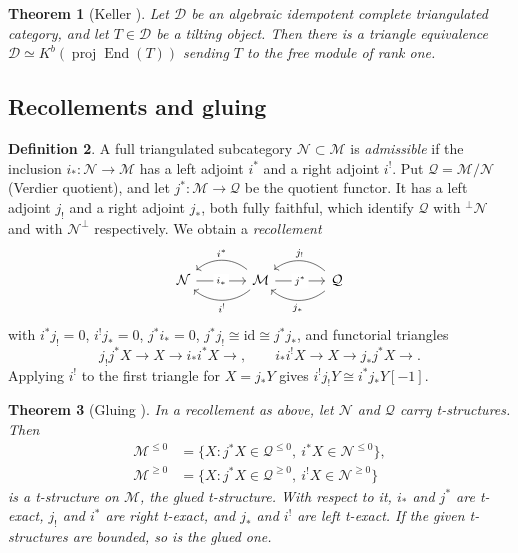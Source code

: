 \documentclass[11pt,reqno]{amsart}
\theoremstyle{plain}
\newtheorem{theorem}{Theorem}[section]
\theoremstyle{definition}
\newtheorem{definition}[theorem]{Definition}
\theoremstyle{remark}
\DeclareMathOperator{\End}{End}
\newcommand{\proj}{\operatorname{proj}}
\newcommand{\Kb}{K^b}
\newcommand{\cD}{\mathcal{D}}
\newcommand{\cN}{\mathcal{N}}
\newcommand{\cM}{\mathcal{M}}
\newcommand{\cQ}{\mathcal{Q}}
\begin{document}
\begin{theorem}[{Keller \cite{Kel94}}]\label{thm:keller}
Let $\cD$ be an algebraic idempotent complete triangulated category, and let $T\in\cD$ be a tilting object. Then there is a triangle equivalence $\cD\simeq\Kb(\proj\End(T))$ sending $T$ to the free module of rank one.
\end{theorem}

\subsection{Recollements and gluing}

\begin{definition}\label{def:recollement}
A full triangulated subcategory $\cN\subset\cM$ is \emph{admissible} if the inclusion $i_*\colon\cN\to\cM$ has a left adjoint $i^*$ and a right adjoint $i^!$. Put $\cQ=\cM/\cN$ (Verdier quotient), and let $j^*\colon\cM\to\cQ$ be the quotient functor. It has a left adjoint $j_!$ and a right adjoint $j_*$, both fully faithful, which identify $\cQ$ with ${}^\perp\cN$ and with $\cN^\perp$ respectively. We obtain a \emph{recollement}
\[
\begin{tikzcd}[column sep=large]
\cN \arrow[r,"i_*" description] & \cM \arrow[l,bend right=40,"i^*"'] \arrow[l,bend left=40,"i^!"] \arrow[r,"j^*" description] & \cQ \arrow[l,bend right=40,"j_!"'] \arrow[l,bend left=40,"j_*"]
\end{tikzcd}
\]
with $i^*j_!=0$, $i^!j_*=0$, $j^*i_*=0$, $j^*j_!\cong\mathrm{id}\cong j^*j_*$, and functorial triangles
\[ j_!j^*X\to X\to i_*i^*X\to,\qquad i_*i^!X\to X\to j_*j^*X\to.\]
Applying $i^!$ to the first triangle for $X=j_*Y$ gives $i^!j_!Y\cong i^*j_*Y[-1]$.
\end{definition}

\begin{theorem}[{Gluing \cite[Thm.~1.4.10 and \S1.4]{BBD82}}]\label{thm:gluing}
In a recollement as above, let $\cN$ and $\cQ$ carry t-structures. Then
\begin{align*}
\cM^{\le0}&=\{X: j^*X\in\cQ^{\le0},\ i^*X\in\cN^{\le0}\},\\
\cM^{\ge0}&=\{X: j^*X\in\cQ^{\ge0},\ i^!X\in\cN^{\ge0}\}
\end{align*}
is a t-structure on $\cM$, the \emph{glued t-structure}. With respect to it, $i_*$ and $j^*$ are t-exact, $j_!$ and $i^*$ are right t-exact, and $j_*$ and $i^!$ are left t-exact. If the given t-structures are bounded, so is the glued one.
\end{theorem}
\end{document}
